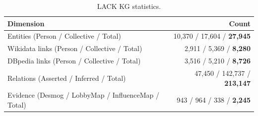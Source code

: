 \begin{table}[t]
\centering
\caption{LACK KG statistics.}
\label{tab:kg-stats}
\small
\begin{tabular}{lr}
\toprule
\textbf{Dimension} & \textbf{Count} \\
\midrule
Entities (Person / Collective / Total)
  & 10,370 / 17,604 / \textbf{27,945} \\
\quad Wikidata links (Person / Collective / Total)
  & 2,911 / 5,369 / \textbf{8,280} \\
\quad DBpedia links (Person / Collective / Total)
  & 3,516 / 5,210 / \textbf{8,726} \\
\midrule
Relations (Asserted / Inferred / Total)
  & 47,450 / 142,737 / \textbf{213,147} \\
Evidence (Desmog / LobbyMap / InfluenceMap / Total)
  & 943 / 964 / 338 / \textbf{2,245} \\
\bottomrule
\end{tabular}
\end{table}
